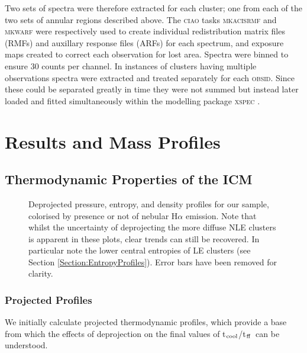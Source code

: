 \documentclass[twocolumn]{aastex6}
\newcommand{\tctff}{{t$_{\rm cool}$/t$_{\rm ff}$}}
\begin{document}
Two sets of spectra were therefore extracted for each cluster; one from each of the two sets of annular regions described above.  The \textsc{ciao} tasks \textsc{mkacisrmf} and \textsc{mkwarf} were respectively used to create individual redistribution matrix files (RMFs) and auxillary response files (ARFs) for each spectrum, and exposure maps created to correct each observation for lost area.  Spectra were binned to ensure 30 counts per channel.  In instances of clusters having multiple observations spectra were extracted and treated separately for each \textsc{obsid}.  Since these could be separated greatly in time they were not summed but instead later loaded and fitted simultaneously within the modelling package \textsc{xspec} \cite[][]{Arnaud96}.


\section{Results and Mass Profiles} \label{Section:Results}

\subsection{Thermodynamic Properties of the ICM}  \label{Section:ICMProperties}

\begin{figure*}    
  \centering
  \caption{Deprojected pressure, entropy, and density profiles for our sample, colorised by presence or not of nebular H$\alpha$ emission.  Note that whilst the uncertainty of deprojecting the more diffuse NLE clusters is apparent in these plots, clear trends can still be recovered.  In particular note the lower central entropies of LE clusters (see Section \ref{Section:EntropyProfiles}).  Error bars have been removed for clarity.}
 \label{Figure:DeprojectedProfiles_DensityPressureEntropy}
\end{figure*}

\subsubsection{Projected Profiles}  \label{Section:ProjectedProfiles}

We initially calculate projected thermodynamic profiles, which provide a base from which the effects of deprojection on the final values of \tctff\ can be understood.
 
\end{document}
